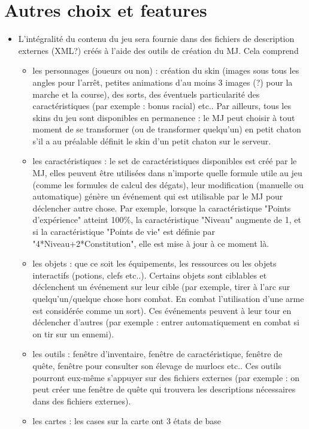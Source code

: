 \documentclass[a4paper]{article}
\begin{document}
	\section{Autres choix et features}
	\begin{itemize}[label={}]
		\item L'intégralité du contenu du jeu sera fournie dans des fichiers de description externes (XML?) créés à l'aide des outils de création du MJ. Cela comprend
		\begin{itemize}
			\item les personnages (joueurs ou non) : création du skin (images sous tous les angles pour l'arrêt, petites animations d'au moins 3 images (?) pour la marche et la course), des sorts, des éventuels particularité des caractéristiques (par exemple : bonus racial) etc..
			Par ailleurs, tous les skins du jeu sont disponibles en permanence : le MJ peut choisir à tout moment de se transformer (ou de transformer quelqu'un) en petit chaton s'il a au préalable définit le skin d'un petit chaton sur le serveur.
			\item les caractéristiques : le set de caractéristiques disponibles est créé par le MJ, elles peuvent être utilisées dans n'importe quelle formule utile au jeu (comme les formules de calcul des dégats), leur modification (manuelle ou automatique) génère un événement qui est utilisable par le MJ pour déclencher autre chose. Par exemple, lorsque la caractéristique "Points d'expérience" atteint 100\%, la caractéristique "Niveau" augmente de 1, et si la caractéristique "Points de vie" est définie par "4*Niveau+2*Constitution", elle est mise à jour à ce moment là.
			\item les objets : que ce soit les équipements, les ressources ou les objets interactifs (potions, clefs etc..). Certains objets sont ciblables et déclenchent un événement sur leur cible (par exemple, tirer à l'arc sur quelqu'un/quelque chose hors combat. En combat l'utilisation d'une arme est considérée comme un sort). Ces événements peuvent à leur tour en déclencher d'autres (par exemple : entrer automatiquement en combat si on tir sur un ennemi).
			\item les outils : fenêtre d'inventaire, fenêtre de caractéristique, fenêtre de quête, fenêtre pour consulter son élevage de murlocs etc.. Ces outils pourront eux-même s'appuyer sur des fichiers externes (par exemple : on peut créer une fenêtre de quête qui trouvera les descriptions nécessaires dans des fichiers externes).
			\item les cartes : les cases sur la carte ont 3 états de base

\end{itemize}
\end{itemize}
\end{document}
